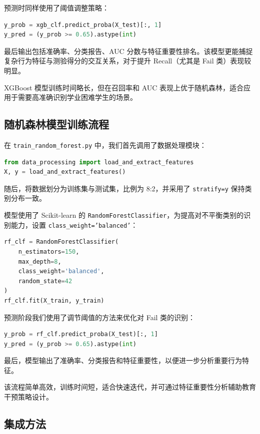 \documentclass{SYSUReport}
\begin{document}
预测时同样使用了阈值调整策略：

\begin{lstlisting}[language=Python]
y_prob = xgb_clf.predict_proba(X_test)[:, 1]
y_pred = (y_prob >= 0.65).astype(int)
\end{lstlisting}

最后输出包括准确率、分类报告、AUC 分数与特征重要性排名。该模型更能捕捉复杂行为特征与测验得分的交互关系，对于提升 Recall（尤其是 Fail 类）表现较明显。

XGBoost 模型训练时间略长，但在召回率和 AUC 表现上优于随机森林，适合应用于需要高准确识别学业困难学生的场景。


\subsection{随机森林模型训练流程}

在 \texttt{train\_random\_forest.py} 中，我们首先调用了数据处理模块：

\begin{lstlisting}[language=Python]
from data_processing import load_and_extract_features
X, y = load_and_extract_features()
\end{lstlisting}

随后，将数据划分为训练集与测试集，比例为 8:2，并采用了 \texttt{stratify=y} 保持类别分布一致。

模型使用了 Scikit-learn 的 \texttt{RandomForestClassifier}，为提高对不平衡类别的识别能力，设置 \texttt{class\_weight='balanced'}：

\begin{lstlisting}[language=Python]
rf_clf = RandomForestClassifier(
    n_estimators=150,
    max_depth=8,
    class_weight='balanced',
    random_state=42
)
rf_clf.fit(X_train, y_train)
\end{lstlisting}

预测阶段我们使用了调节阈值的方法来优化对 Fail 类的识别：

\begin{lstlisting}[language=Python]
y_prob = rf_clf.predict_proba(X_test)[:, 1]
y_pred = (y_prob >= 0.65).astype(int)
\end{lstlisting}

最后，模型输出了准确率、分类报告和特征重要性，以便进一步分析重要行为特征。

该流程简单高效，训练时间短，适合快速迭代，并可通过特征重要性分析辅助教育干预策略设计。

\subsection{集成方法}
\end{document}
